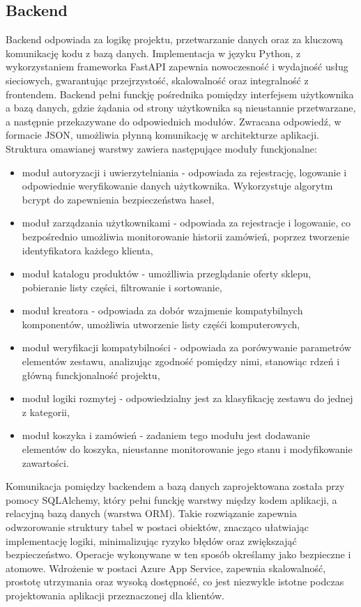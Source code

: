 \documentclass[a4paper,twoside,12pt]{book}
\begin{document}
\subsection{Backend}
Backend odpowiada za logikę projektu, przetwarzanie danych oraz za kluczową komunikację kodu z bazą danych. Implementacja w języku Python, z wykorzystaniem frameworka FastAPI zapewnia nowoczesność i wydajność usług sieciowych, gwarantując przejrzystość, skalowalność oraz integralność z frontendem. Backend pełni funckję pośrednika pomiędzy interfejsem użytkownika a bazą danych, gdzie żądania od strony użytkownika są nieustannie przetwarzane, a następnie przekazywane do odpowiednich modułów. Zwracana odpowiedź, w formacie JSON, umożliwia płynną komunikację w architekturze aplikacji.
\\
Struktura omawianej warstwy zawiera następujące moduły funckjonalne:
\begin{itemize}
    \item moduł autoryzacji i uwierzytelniania - odpowiada za rejestrację, logowanie i odpowiednie weryfikowanie danych użytkownika. Wykorzystuje algorytm bcrypt do zapewnienia bezpieczeństwa haseł,
    \item moduł zarządzania użytkownikami - odpowiada za rejestracje i logowanie, co bezpośrednio umożliwia monitorowanie historii zamówień, poprzez tworzenie identyfikatora każdego klienta,
    \item moduł katalogu produktów - umożlliwia przeglądanie oferty sklepu, pobieranie listy części, filtrowanie i sortowanie,
    \item moduł kreatora - odpowiada za dobór wzajmenie kompatybilnych komponentów, umożliwia utworzenie listy częśći komputerowych,
    \item moduł weryfikacji kompatybilności - odpowiada za porówywanie parametrów elementów zestawu, analizując zgodność pomiędzy nimi, stanowiąc rdzeń i główną funckjonalność projektu,
    \item moduł logiki rozmytej - odpowiedzialny jest za klasyfikację zestawu do jednej z kategorii,
    \item moduł koszyka i zamówień - zadaniem tego modułu jest dodawanie elementów do koszyka, nieustanne monitorowanie jego stanu i modyfikowanie zawartości.
\end{itemize}

Komunikacja pomiędzy backendem a bazą danych zaprojektowana została przy pomocy SQLAlchemy, który pełni funckję warstwy między kodem aplikacji, a relacyjną bazą danych (warstwa ORM). Takie rozwiązanie zapewnia odwzorowanie struktury tabel w postaci obiektów, znacząco ułatwiając implementację logiki, minimalizując ryzyko błędów oraz zwiększająć bezpieczeństwo. Operacje wykonywane w ten sposób określamy jako bezpieczne i atomowe. Wdrożenie w postaci Azure App Service, zapewnia skalowalność, prostotę utrzymania oraz wysoką dostępność, co jest niezwykle istotne podczas projektowania aplikacji przeznaczonej dla klientów. 
\end{document}
